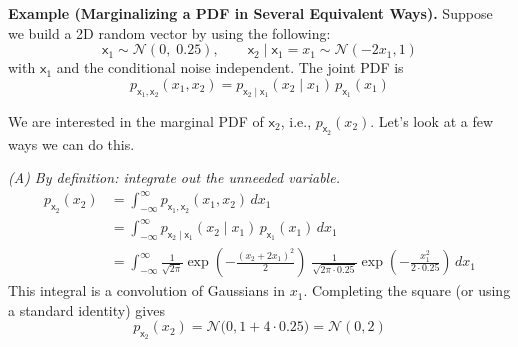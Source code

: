\begin{exampleBox}
    \textbf{Example (Marginalizing a PDF in Several Equivalent Ways).}
    Suppose we build a 2D random vector by using the following:
    \begin{equation}
        \mathsf{x}_1 \sim \mathcal{N}(0,\;0.25), 
        \qquad 
        \mathsf{x}_2 \mid \mathsf{x}_1=x_1 \sim \mathcal{N}(-2x_1,1)
    \end{equation}
    with $\mathsf{x}_1$ and the conditional noise independent. The joint PDF is
    \begin{equation}
        p_{\mathsf{x}_1,\mathsf{x}_2}(x_1,x_2)
        = p_{\mathsf{x}_2\mid \mathsf{x}_1}(x_2\mid x_1)\,p_{\mathsf{x}_1}(x_1)
    \end{equation}
    
    We are interested in the marginal PDF of $\mathsf{x}_2$, i.e., $p_{\mathsf{x}_2}(x_2)$. Let's look at a few ways we can do this.
    
    \medskip
    \textit{(A) By definition: integrate out the unneeded variable.}
    \begin{align}
    p_{\mathsf{x}_2}(x_2)
    &= \int_{-\infty}^{\infty} p_{\mathsf{x}_1,\mathsf{x}_2}(x_1,x_2)\,dx_1 \\
    &= \int_{-\infty}^{\infty} p_{\mathsf{x}_2\mid \mathsf{x}_1}(x_2\mid x_1)\,p_{\mathsf{x}_1}(x_1)\,dx_1 \label{eq:marg_def} \\
    &= \int_{-\infty}^{\infty}
    \frac{1}{\sqrt{2\pi}}\exp\!\left(-\frac{(x_2+2x_1)^2}{2}\right)\;
    \frac{1}{\sqrt{2\pi\cdot 0.25}}\exp\!\left(-\frac{x_1^2}{2\cdot 0.25}\right)\,dx_1
    \end{align}
    This integral is a convolution of Gaussians in $x_1$. Completing the square (or using a standard identity) gives
    \begin{equation}
        p_{\mathsf{x}_2}(x_2)=\mathcal{N}\big(0,1+4\cdot 0.25\big)=\mathcal{N}(0,2)
    \end{equation}
    

\end{exampleBox}
